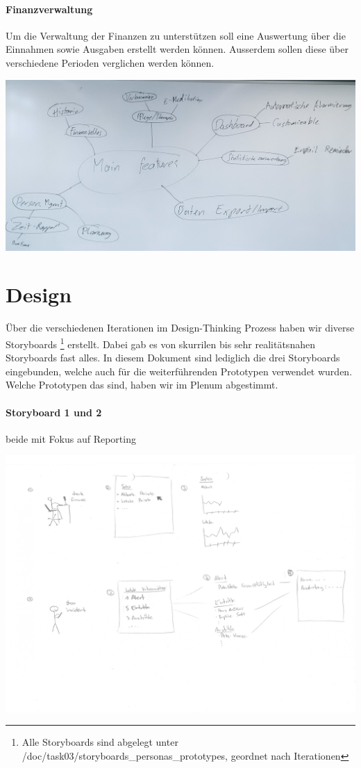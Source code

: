 \documentclass[a4paper]{scrreprt}
\begin{document}
\paragraph{Finanzverwaltung}
Um die Verwaltung der Finanzen zu unterstützen soll eine Auswertung über die Einnahmen sowie Ausgaben erstellt werden können. Ausserdem sollen diese über verschiedene Perioden verglichen werden können.

\bigskip

\includegraphics[width=1\textwidth]{img/cropped_mindmap-mainfeatures}

\pagebreak

\section{Design}
Über die verschiedenen Iterationen im Design-Thinking Prozess haben wir diverse Storyboards \footnote{Alle Storyboards sind  abgelegt unter /doc/task03/storyboards\_personas\_prototypes, geordnet nach Iterationen} erstellt. Dabei gab es von skurrilen bis sehr realitätsnahen Storyboards fast alles. In diesem Dokument sind lediglich die drei Storyboards eingebunden, welche auch für die weiterführenden Prototypen verwendet wurden. Welche Prototypen das sind, haben wir im Plenum abgestimmt.

\paragraph{Storyboard 1 und 2} beide mit Fokus auf Reporting

\includegraphics[width=1\textwidth]{storyboards_personas_prototypes/iteration3/sidlm3_storyboard2+3.png}
\end{document}
